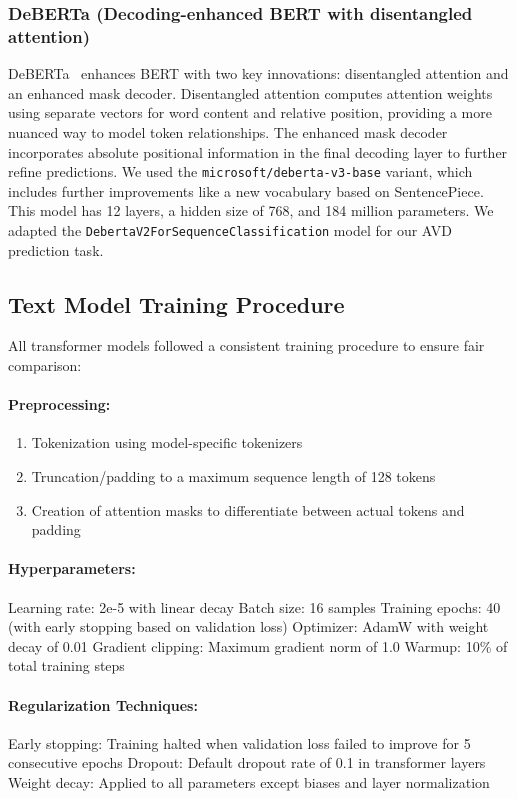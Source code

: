 \documentclass[12pt]{article}
\begin{document}
\subsubsection{DeBERTa (Decoding-enhanced BERT with disentangled attention)}
DeBERTa~\cite{he2020deberta} enhances BERT with two key innovations: disentangled attention and an enhanced mask decoder. Disentangled attention computes attention weights using separate vectors for word content and relative position, providing a more nuanced way to model token relationships. The enhanced mask decoder incorporates absolute positional information in the final decoding layer to further refine predictions. We used the \texttt{microsoft/deberta-v3-base} variant, which includes further improvements like a new vocabulary based on SentencePiece. This model has 12 layers, a hidden size of 768, and 184 million parameters. We adapted the \texttt{DebertaV2ForSequenceClassification} model for our AVD prediction task.

\subsection{Text Model Training Procedure}
All transformer models followed a consistent training procedure to ensure fair comparison:

\paragraph{Preprocessing:}
\begin{enumerate}
    \item Tokenization using model-specific tokenizers
    \item Truncation/padding to a maximum sequence length of 128 tokens
    \item Creation of attention masks to differentiate between actual tokens and padding
\end{enumerate}

\paragraph{Hyperparameters:}
    Learning rate: 2e-5 with linear decay
    Batch size: 16 samples
    Training epochs: 40 (with early stopping based on validation loss)
    Optimizer: AdamW with weight decay of 0.01
    Gradient clipping: Maximum gradient norm of 1.0
    Warmup: 10\% of total training steps

\paragraph{Regularization Techniques:}
    Early stopping: Training halted when validation loss failed to improve for 5 consecutive epochs
    Dropout: Default dropout rate of 0.1 in transformer layers
    Weight decay: Applied to all parameters except biases and layer normalization
\end{document}
